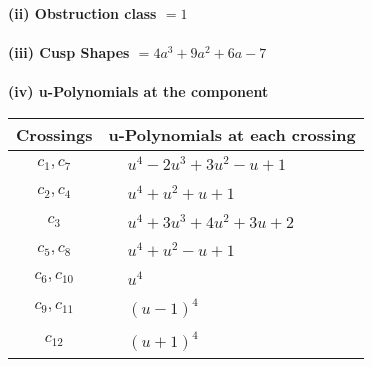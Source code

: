 \documentclass[1p]{elsarticle_modified}
\theoremstyle{definition}
\begin{document}
\flushleft \textbf{(ii) Obstruction class $= 1$}\\~\\
\flushleft \textbf{(iii) Cusp Shapes $= 4 a^3+9 a^2+6 a-7$}\\~\\
\newpage\renewcommand{\arraystretch}{1}
\flushleft \textbf{(iv) u-Polynomials at the component}\newline \\
\begin{tabular}{m{50pt}|m{274pt}}
Crossings & \hspace{64pt}u-Polynomials at each crossing \\
\hline $$\begin{aligned}c_{1},c_{7}\end{aligned}$$&$\begin{aligned}
&u^4-2 u^3+3 u^2- u+1
\end{aligned}$\\
\hline $$\begin{aligned}c_{2},c_{4}\end{aligned}$$&$\begin{aligned}
&u^4+u^2+u+1
\end{aligned}$\\
\hline $$\begin{aligned}c_{3}\end{aligned}$$&$\begin{aligned}
&u^4+3 u^3+4 u^2+3 u+2
\end{aligned}$\\
\hline $$\begin{aligned}c_{5},c_{8}\end{aligned}$$&$\begin{aligned}
&u^4+u^2- u+1
\end{aligned}$\\
\hline $$\begin{aligned}c_{6},c_{10}\end{aligned}$$&$\begin{aligned}
&u^4
\end{aligned}$\\
\hline $$\begin{aligned}c_{9},c_{11}\end{aligned}$$&$\begin{aligned}
&(u-1)^4
\end{aligned}$\\
\hline $$\begin{aligned}c_{12}\end{aligned}$$&$\begin{aligned}
&(u+1)^4
\end{aligned}$\\
\hline
\end{tabular}\\~\\
\end{document}
